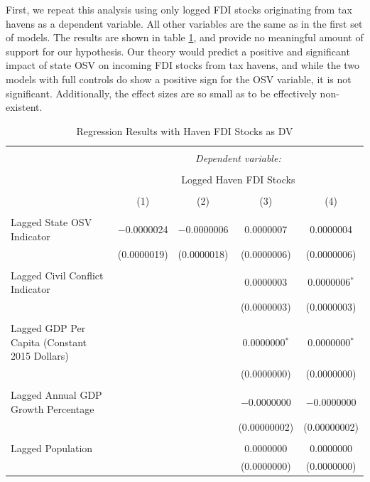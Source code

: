 \documentclass[11pt, titlepage]{article} %
\begin{document}
First, we repeat this analysis using only logged FDI stocks originating from tax havens as a dependent variable. All other variables are the same as in the first set of models. The results are shown in table \ref{havenFDIstocksDV}, and provide no meaningful amount of support for our hypothesis. Our theory would predict a positive and significant impact of state OSV on incoming FDI stocks from tax havens, and while the two models with full controls do show a positive sign for the OSV variable, it is not significant. Additionally, the effect sizes are so small as to be effectively non-existent.

\begin{table}[!htbp] \centering 
  \caption{Regression Results with Haven FDI Stocks as DV} 
  \label{havenFDIstocksDV} 
\small 
\begin{tabular}{@{\extracolsep{5pt}}lcccc} 
\\[-1.8ex]\hline 
\hline \\[-1.8ex] 
 & \multicolumn{4}{c}{\textit{Dependent variable:}} \\ 
\cline{2-5} 
\\[-1.8ex] & \multicolumn{4}{c}{Logged Haven FDI Stocks} \\ 
\\[-1.8ex] & (1) & (2) & (3) & (4)\\ 
\hline \\[-1.8ex] 
 Lagged State OSV Indicator & $-$0.0000024 & $-$0.0000006 & 0.0000007 & 0.0000004 \\ 
  & (0.0000019) & (0.0000018) & (0.0000006) & (0.0000006) \\ 
  & & & & \\ 
 Lagged Civil Conflict Indicator &  &  & 0.0000003 & 0.0000006$^{*}$ \\ 
  &  &  & (0.0000003) & (0.0000003) \\ 
  & & & & \\ 
 Lagged GDP Per Capita (Constant 2015 Dollars) &  &  & 0.0000000$^{*}$ & 0.0000000$^{*}$ \\ 
  &  &  & (0.0000000) & (0.0000000) \\ 
  & & & & \\ 
 Lagged Annual GDP Growth Percentage &  &  & $-$0.0000000 & $-$0.0000000 \\ 
  &  &  & (0.00000002) & (0.00000002) \\ 
  & & & & \\ 
 Lagged Population &  &  & 0.0000000 & 0.0000000 \\ 
  &  &  & (0.0000000) & (0.0000000) \\ 

\end{tabular}
\end{table}
\end{document}
